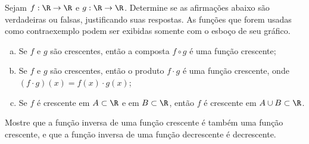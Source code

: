 \begin{exercise}
Sejam $f: \R \to \R $ e $g: \R \to \R$. Determine se as
afirmações abaixo são verdadeiras ou falsas, justificando suas
respostas. As funções que forem usadas como contraexemplo podem ser
exibidas somente com o esboço de seu gráfico.
\begin{enumerate}[(a)]
  \item Se $f$ e $g$ são crescentes, então a composta $f \circ g$ é uma função crescente;
  \item Se $f$ e $g$ são crescentes, então o produto $f\cdot g$ é
  uma função crescente, onde $(f \cdot g)(x) = f(x) \cdot g(x)$;
  \item Se $f$ é crescente em $A \subset \R$ e em $B \subset \R$, então $f$ é crescente em $A \cup B \subset \R$.
\end{enumerate}
\end{exercise}

\begin{exercise}
\label{exer:inversa-funcao-crescente}
Mostre que a função inversa de uma função crescente é também uma
função crescente, e que a função inversa de uma função decrescente é
decrescente.
\end{exercise}